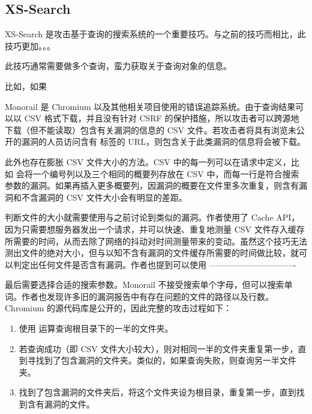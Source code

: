 \subsection{XS-Search}

XS-Search 是攻击基于查询的搜索系统的一个重要技巧。与之前的技巧而相比，此技巧更加。。。

此技巧通常需要做多个查询，蛮力获取关于查询对象的信息。

比如，如果

Monorail 是 Chromium 以及其他相关项目使用的错误追踪系统。由于查询结果可以以 CSV 格式下载，并且没有针对 CSRF 的保护措施，所以攻击者可以跨源地下载（但不能读取）包含有关漏洞的信息的 CSV 文件。若攻击者将具有浏览未公开的漏洞的人员访问含有  标签的 URL，则包含关于此类漏洞的信息将会被下载。

此外也存在膨胀 CSV 文件大小的方法。CSV 中的每一列可以在请求中定义，比如  会将一个编号列以及三个相同的概要列存放在 CSV 中，而每一行是符合搜索参数的漏洞。如果再插入更多概要列，因漏洞的概要在文件里多次重复，则含有漏洞和不含漏洞的 CSV 文件大小会有明显的差距。

判断文件的大小就需要使用与之前讨论到类似的漏洞。作者使用了 Cache API，因为只需要想服务器发出一个请求，并可以快速、重复地测量 CSV 文件存入缓存所需要的时间，从而去除了网络的抖动对时间测量带来的变动。虽然这个技巧无法测出文件的绝对大小，但与以知不含有漏洞的文件缓存所需要的时间做比较，就可以判定出任何文件是否含有漏洞。作者也提到可以使用 -------------------------------

最后需要选择合适的搜索参数。Monorail 不接受搜索单个字母，但可以搜索单词。作者也发现许多旧的漏洞报告中有存在问题的文件的路径以及行数。Chromium 的源代码库是公开的，因此完整的攻击过程如下：

\begin{enumerate}
    \item 使用  运算查询根目录下的一半的文件夹。
    \item 若查询成功（即 CSV 文件大小较大），则对相同一半的文件夹重复第一步，直到寻找到了包含漏洞的文件夹。类似的，如果查询失败，则查询另一半文件夹。
    \item 找到了包含漏洞的文件夹后，将这个文件夹设为根目录，重复第一步，直到找到含有漏洞的文件。
\end{enumerate}

